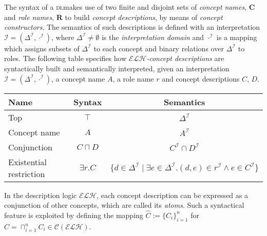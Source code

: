 \documentclass[]{llncs}
\theoremstyle{remark}
\newcommand{\elh}{\(\mathcal{ELH}{}\)}
\newcommand{\DeltaI}{\Delta^\mathcal{I}}
\newcommand{\dotI}{\cdot^{\mathcal{I}}}
\newcommand{\dl}{\textsc{dl}}
\begin{document}
  The syntax of a \dl makes use of two finite and disjoint sets of \emph{concept names}, \(\mathbf{C}\) and \emph{role names}, \(\mathbf{R}\) to build \emph{concept descriptions}, by means of \emph{concept constructors}.
  The semantics of such descriptions is defined with an interpretation \(\mathcal{I} = (\DeltaI,\dotI)\), where \(\DeltaI \ne \emptyset\) is the \emph{interpretation domain} and \(\dotI\) is a mapping which assigns subsets of \(\DeltaI{}\) to each concept and binary relations over \(\DeltaI\) to roles.
  The following table specifies how \emph{\elh-concept descriptions} are syntactically built and semantically interpreted, given an interpretation \(\mathcal{I} = (\DeltaI,\dotI)\), a concept name \(A\), a role name \(r\) and concept descriptions \(C\), \(D\).
  \begin{center}
    \begin{tabular}{lcc}
      \toprule
      Name & Syntax & Semantics \\
      \midrule
      Top & \(\top\) & \(\DeltaI\) \\
      Concept name & \(A\) & \(A^\mathcal{I}\) \\
      Conjunction & \(C \sqcap D\) & \(C^\mathcal{I} \cap D^\mathcal{I}\) \\
      Existential restriction & \(\exists{}r.C\) &
      \(\lbrace d \in \DeltaI \mid \exists e \in \DeltaI.
      (d,e) \in r^\mathcal{I} \land e \in C^\mathcal{I} \rbrace\) \\
      \bottomrule
    \end{tabular}
  \end{center}

  In the description logic \elh{}, each concept description can be expressed as a conjunction of other concepts, which are called its \emph{atoms}.
  Such a syntactical feature is exploited by defining the mapping
  \(\widehat{C} := \lbrace C_i\rbrace_{i=1}^n\) for
  \(C = \sqcap_{i=1}^n C_i \in \mathcal{C}(\mathcal{ELH})\).
\end{document}
